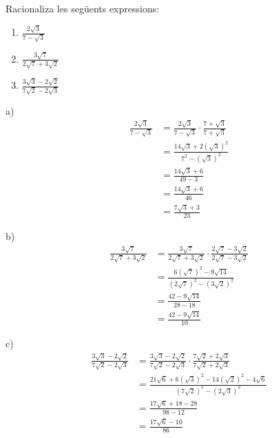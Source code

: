 \begin{exercici}
Racionaliza les següents expressions:

\begin{enumerate}
\item[a)] $\frac{2\sqrt{3}}{7-\sqrt{3}}$

\item[b)] $\frac{3\sqrt{7}}{2\sqrt{7}+3\sqrt{2}}$

\item[c)] $\frac{3\sqrt{3}-2\sqrt{2}}{7\sqrt{2}-2\sqrt{3}}$
\end{enumerate}

\end{exercici}

\begin{solucio}
a)%
\begin{align*}
\frac{2\sqrt{3}}{7-\sqrt{3}} &=\frac{2\sqrt{3}}{7-\sqrt{3}}\cdot \frac{7+%
\sqrt{3}}{7+\sqrt{3}} \\
&=\frac{14\sqrt{3}+2\left( \sqrt{3}\right) ^{2}}{7^{2}-\left( \sqrt{3}%
\right) ^{2}} \\
&=\frac{14\sqrt{3}+6}{49-3} \\
&=\frac{14\sqrt{3}+6}{46} \\
&=\frac{7\sqrt{3}+3}{23}
\end{align*}

b)%
\begin{align*}
\frac{3\sqrt{7}}{2\sqrt{7}+3\sqrt{2}} &=\frac{3\sqrt{7}}{2\sqrt{7}+3\sqrt{2}%
}\cdot \frac{2\sqrt{7}-3\sqrt{2}}{2\sqrt{7}-3\sqrt{2}} \\
&=\frac{6\left( \sqrt{7}\right) ^{2}-9\sqrt{14}}{\left( 2\sqrt{7}\right)
^{2}-\left( 3\sqrt{2}\right) ^{2}} \\
&=\frac{42-9\sqrt{14}}{28-18} \\
&=\frac{42-9\sqrt{14}}{10}
\end{align*}

c)%
\begin{align*}
\frac{3\sqrt{3}-2\sqrt{2}}{7\sqrt{2}-2\sqrt{3}} &=\frac{3\sqrt{3}-2\sqrt{2}%
}{7\sqrt{2}-2\sqrt{3}}\cdot \frac{7\sqrt{2}+2\sqrt{3}}{7\sqrt{2}+2\sqrt{3}}
\\
&=\frac{21\sqrt{6}+6\left( \sqrt{3}\right) ^{2}-14\left( \sqrt{2}\right)
^{2}-4\sqrt{6}}{\left( 7\sqrt{2}\right) ^{2}-\left( 2\sqrt{3}\right) ^{2}} \\
&=\frac{17\sqrt{6}+18-28}{98-12} \\
&=\frac{17\sqrt{6}-10}{86}
\end{align*}
\end{solucio}

